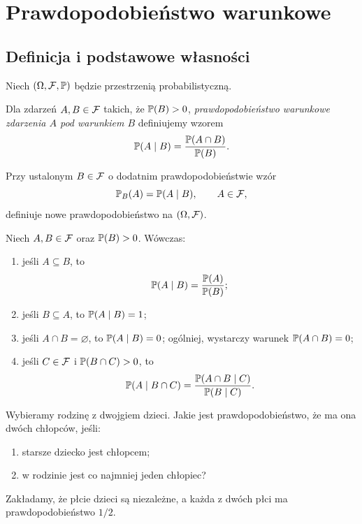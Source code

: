 \chapter{Prawdopodobieństwo warunkowe}
\label{chap:warunkowe}

\section{Definicja i podstawowe własności}
\label{sec:warunkowe}

Niech $(\Omega,\mathcal{F},\mathbb{P})$ będzie przestrzenią probabilistyczną.

\begin{definicja}
\label{def:warunkowe}
Dla zdarzeń $A,B\in\mathcal{F}$ takich, że $\mathbb{P}(B)>0$,
\emph{prawdopodobieństwo warunkowe zdarzenia $A$ pod warunkiem $B$}
definiujemy wzorem
\begin{equation}
  \mathbb{P}(A\mid B)=\frac{\mathbb{P}(A\cap B)}{\mathbb{P}(B)}.
  \label{eq:warunkowe}
\end{equation}
\end{definicja}

\begin{uwaga}
Przy ustalonym $B\in\mathcal{F}$ o dodatnim prawdopodobieństwie wzór
\[
  \mathbb{P}_B(A)=\mathbb{P}(A\mid B),\qquad A\in\mathcal{F},
\]
definiuje nowe prawdopodobieństwo na $(\Omega,\mathcal{F})$.
\end{uwaga}

\begin{fakt}
\label{fakt:wlasnosci-warunkowego}
Niech $A,B\in\mathcal{F}$ oraz $\mathbb{P}(B)>0$. Wówczas:
\begin{enumerate}
  \item jeśli $A\subseteq B$, to
    \[
      \mathbb{P}(A\mid B)=\frac{\mathbb{P}(A)}{\mathbb{P}(B)};
    \]
  \item jeśli $B\subseteq A$, to $\mathbb{P}(A\mid B)=1$;
  \item jeśli $A\cap B=\varnothing$, to $\mathbb{P}(A\mid B)=0$;
    ogólniej, wystarczy warunek $\mathbb{P}(A\cap B)=0$;
  \item jeśli $C\in\mathcal{F}$ i $\mathbb{P}(B\cap C)>0$, to
    \begin{equation}
      \mathbb{P}(A\mid B\cap C)
        =\frac{\mathbb{P}(A\cap B\mid C)}{\mathbb{P}(B\mid C)}.
      \label{eq:warunkowanie-dwukrotne}
    \end{equation}
\end{enumerate}
\end{fakt}

\begin{przyklad}
\label{przykl:dzieci}
Wybieramy rodzinę z dwojgiem dzieci. Jakie jest prawdopodobieństwo,
że ma ona dwóch chłopców, jeśli:
\begin{enumerate}[label=\alph*)]
  \item starsze dziecko jest chłopcem;
  \item w rodzinie jest co najmniej jeden chłopiec?
\end{enumerate}
Zakładamy, że płcie dzieci są niezależne, a każda z dwóch płci ma
prawdopodobieństwo $1/2$.
\end{przyklad}

